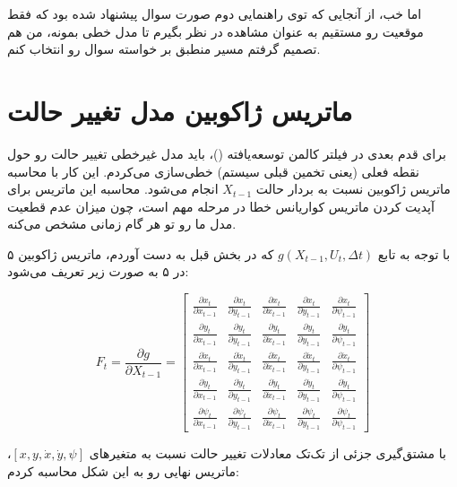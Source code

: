 \documentclass[12pt,a4paper]{article}
\begin{document}
اما خب، از آنجایی که توی راهنمایی دوم صورت سوال پیشنهاد شده بود که فقط موقعیت  رو مستقیم به عنوان مشاهده در نظر بگیرم تا مدل خطی بمونه، من هم تصمیم گرفتم مسیر منطبق بر خواسته سوال رو انتخاب کنم.

\section{ماتریس ژاکوبین مدل تغییر حالت}

برای قدم بعدی در فیلتر کالمن توسعه‌یافته ()، باید مدل غیرخطی تغییر حالت رو حول نقطه فعلی (یعنی تخمین قبلی سیستم) خطی‌سازی می‌کردم. این کار با محاسبه ماتریس ژاکوبین نسبت به بردار حالت $X_{t-1}$ انجام می‌شود. محاسبه این ماتریس برای آپدیت کردن ماتریس کواریانس خطا در مرحله  مهم است، چون میزان عدم قطعیت مدل ما رو تو هر گام زمانی مشخص می‌کنه.

با توجه به تابع $g(X_{t-1}, U_t, \Delta t)$ که در بخش قبل به دست آوردم، ماتریس ژاکوبین ۵ در ۵ به صورت زیر تعریف می‌شود:

$$F_t = \frac{\partial g}{\partial X_{t-1}} = \begin{bmatrix}
	\frac{\partial x_t}{\partial x_{t-1}} & \frac{\partial x_t}{\partial y_{t-1}} & \frac{\partial x_t}{\partial \dot{x}_{t-1}} & \frac{\partial x_t}{\partial \dot{y}_{t-1}} & \frac{\partial x_t}{\partial \psi_{t-1}} \\
	\frac{\partial y_t}{\partial x_{t-1}} & \frac{\partial y_t}{\partial y_{t-1}} & \frac{\partial y_t}{\partial \dot{x}_{t-1}} & \frac{\partial y_t}{\partial \dot{y}_{t-1}} & \frac{\partial y_t}{\partial \psi_{t-1}} \\
	\frac{\partial \dot{x}_t}{\partial x_{t-1}} & \frac{\partial \dot{x}_t}{\partial y_{t-1}} & \frac{\partial \dot{x}_t}{\partial \dot{x}_{t-1}} & \frac{\partial \dot{x}_t}{\partial \dot{y}_{t-1}} & \frac{\partial \dot{x}_t}{\partial \psi_{t-1}} \\
	\frac{\partial \dot{y}_t}{\partial x_{t-1}} & \frac{\partial \dot{y}_t}{\partial y_{t-1}} & \frac{\partial \dot{y}_t}{\partial \dot{x}_{t-1}} & \frac{\partial \dot{y}_t}{\partial \dot{y}_{t-1}} & \frac{\partial \dot{y}_t}{\partial \psi_{t-1}} \\
	\frac{\partial \psi_t}{\partial x_{t-1}} & \frac{\partial \psi_t}{\partial y_{t-1}} & \frac{\partial \psi_t}{\partial \dot{x}_{t-1}} & \frac{\partial \psi_t}{\partial \dot{y}_{t-1}} & \frac{\partial \psi_t}{\partial \psi_{t-1}}
\end{bmatrix}$$

با مشتق‌گیری جزئی از تک‌تک معادلات تغییر حالت نسبت به متغیرهای $\left[x, y, \dot{x}, \dot{y}, \psi\right]$، ماتریس نهایی رو به این شکل محاسبه کردم:
\end{document}
